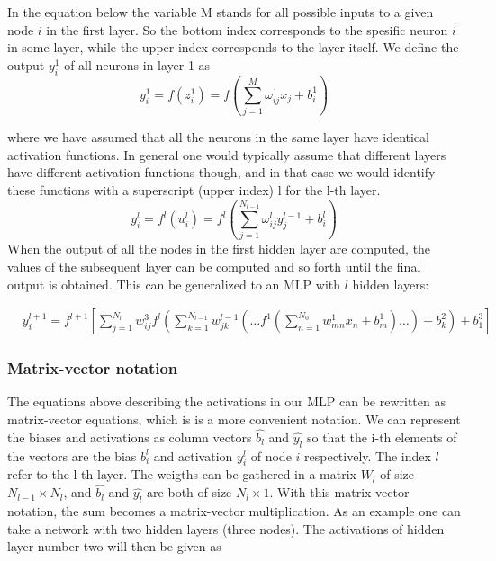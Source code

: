 \documentclass[a4paper,12pt]{article}
\begin{document}
In the equation below the variable M stands for all possible inputs to a given node $i$ in the first layer. So the bottom index corresponds to the spesific neuron $i$ in some layer, while the upper index corresponds to the layer itself. We define the output $y_i^1$ of all neurons in layer 1 as
\begin{equation}
    y_i^1 = f(z_i^1) = f( \sum_{j=1}^M \omega_{ij}^1 x_j + b_i^1 )
\end{equation}

where we have assumed that all the neurons in the same layer have identical activation functions. In general one would typically assume that different layers have different activation functions though, and in that case we would identify these functions with a superscript (upper index) l for the l-th layer.
\begin{equation}
    y_i^l = f^l(u_i^l) = f^l( \sum_{j=1}^{N_{l-1}} \omega_{ij}^l y_j^{l-1} + b_i^l )
\end{equation}
When the output of all the nodes in the first hidden layer are computed, the values of the subsequent layer can be computed and so forth until the final output is obtained.\newline
This can be generalized to an MLP with $l$ hidden layers:

\begin{align}
&y^{l+1}_i = f^{l+1}\left[\!\sum_{j=1}^{N_l} w_{ij}^3 f^l\left(\sum_{k=1}^{N_{l-1}}w_{jk}^{l-1}\left(\dots f^1\left(\sum_{n=1}^{N_0} w_{mn}^1 x_n+ b_m^1\right)\dots\right)+b_k^2\right)+b_1^3\right]
\end{align}


\subsubsection{Matrix-vector notation}
The equations above describing the activations in our MLP can be rewritten as matrix-vector equations, which is is a more convenient notation.\newline
We can represent the biases and activations as column vectors $\hat{b_l}$ and $\hat{y_l}$ so that the i-th elements of the vectors are the bias $b_i^l$ and activation $y_i^l$ of node $i$ respectively. The index $l$ refer to the l-th layer.\newline
The weigths can be gathered in a matrix $W_l$ of size $N_{l-1} \times N_l$, and $\hat{b_l}$ and $\hat{y_l}$ are both of size $N_l \times 1$. With this matrix-vector notation, the sum becomes a matrix-vector multiplication. As an example one can take a network with two hidden layers (three nodes). The activations of hidden layer number two will then be given as
\end{document}
